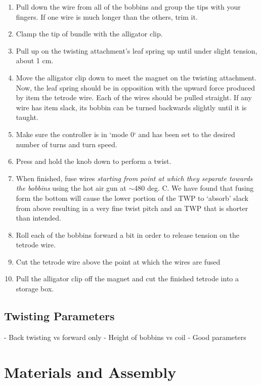 \documentclass[11pt,a4paper]{article}
\begin{document}
\begin{enumerate}[noitemsep]
    \item Pull down the wire from all of the bobbins and group the tips with
        your fingers. If one wire is much longer than the others, trim it.
    \item Clamp the tip of bundle with the alligator clip.
    \item Pull up on the twisting attachment's leaf spring up until under
        slight tension, about 1 cm.
    \item Move the alligator clip down to meet the magnet on the twisting attachment.
        Now, the leaf spring should be in opposition with the upward force
        produced by item the tetrode wire. Each of the wires should be pulled
        straight. If any wire has item slack, its bobbin can be turned
        backwards slightly until it is taught.
    \item Make sure the controller is in `mode 0` and has been set to the
        desired number of turns and turn speed.
    \item Press and hold the knob down to perform a twist.
    \item When finished, fuse wires \textit{starting from point at which
        they separate towards the bobbins} using the hot air gun at $\sim$480 deg.
        C. We have found that fusing form the bottom will cause the lower
        portion of the TWP to `absorb' slack from above resulting in a very
        fine twist pitch and an TWP that is shorter than intended.
    \item Roll each of the bobbins forward a bit in order to release tension
        on the tetrode wire.
    \item Cut the tetrode wire above the point at which the wires are fused
    \item Pull the alligator clip off the magnet and cut the finished
        tetrode into a storage box.
\end{enumerate}

\subsection{Twisting Parameters}
- Back twisting vs forward only
- Height of bobbins vs coil
- Good parameters

\section{Materials and Assembly}
\end{document}
